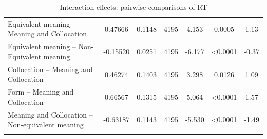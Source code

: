 \documentclass[output=paper,colorlinks,citecolor=brown,nonflat]{langsci/langscibook}
\begin{document}
\begin{table}
\begin{tabular}{>{\raggedright}p{3.75cm} S[table-format=-1.4] S[table-format=1.4] S[table-format=3.0] S[table-format=-1.4] S[table-format=<1.4] S[table-format=-1.2] }
        Equivalent meaning -- Meaning and Collocation & 0.47666 & 0.1148 & 4195 & 4.153 & 0.0005 & 1.13\\
        Equivalent meaning -- Non-Equivalent meaning & -0.15520 & 0.0251 & 4195 & -6.177 & <0.0001 & -0.37\\
        Collocation -- Meaning and Collocation & 0.46274 & 0.1403 & 4195 & 3.298 & 0.0126 & 1.09\\
        Form -- Meaning and Collocation & 0.66567 & 0.1315 & 4195 & 5.064 & <0.0001 & 1.57\\
        Meaning and Collocation -- Non-equivalent meaning & -0.63187 & 0.1143 & 4195 & -5.530 & <0.0001 & -1.49\\
    \lspbottomrule
    \end{tabular}
    \caption{Interaction effects: pairwise comparisons of RT\label{tab:gudmundson:5}}
\end{table}
\end{document}
